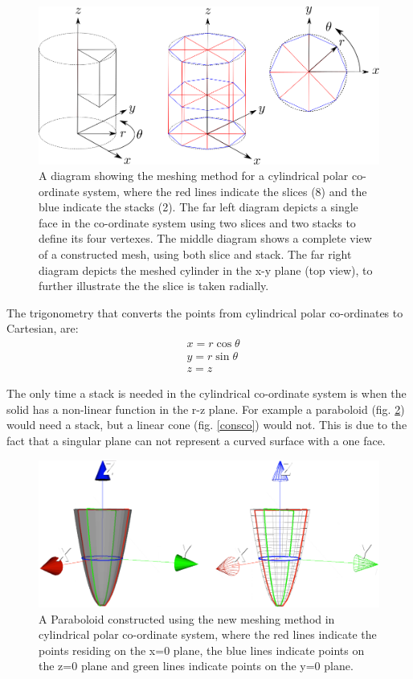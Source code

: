 \documentclass[12pt,a4paper]{article}
\begin{document}
\begin{figure}[h!]
\centering
\includegraphics[scale=0.45]{Images//Coords//cyl.png}
\caption[width=\columnwidth]{A diagram showing the meshing method for a cylindrical polar co-ordinate system, where the red lines indicate the slices (8) and the blue indicate the stacks (2). The far left diagram depicts a single face in the co-ordinate system using two slices and two stacks to define its four vertexes. The middle diagram shows a complete view of a constructed mesh, using both slice and stack. The far right diagram depicts the meshed cylinder in the x-y plane (top view), to further illustrate the the slice is taken radially.}
\label{cylmeshin}
\end{figure}
The trigonometry that converts the points from cylindrical polar co-ordinates to Cartesian, are:
\begin{equation}
\begin{aligned}
\label{cyctrig}
& x = r \cos{\theta} \\
& y = r \sin{\theta} \\
& z = z
\end{aligned}
\end{equation}

\noindent The only time a stack is needed in the cylindrical co-ordinate system is when the solid has a non-linear function in the r-z plane. For example a paraboloid (fig. \ref{paraco}) would need a stack, but a linear cone (fig. \ref{consco}) would not. This is due to the fact that a singular plane can not represent a curved surface with a one face. 

\begin{figure}[h!]
\centering
\includegraphics[scale=0.3]{Images//Coords//para.png}
\caption[width=\columnwidth]{A Paraboloid constructed using the new meshing method in cylindrical polar co-ordinate system, where the red lines indicate the points residing on the x=0 plane, the blue lines indicate points on the z=0 plane and green lines indicate points on the y=0 plane.}
\label{paraco}
\end{figure}
\end{document}
